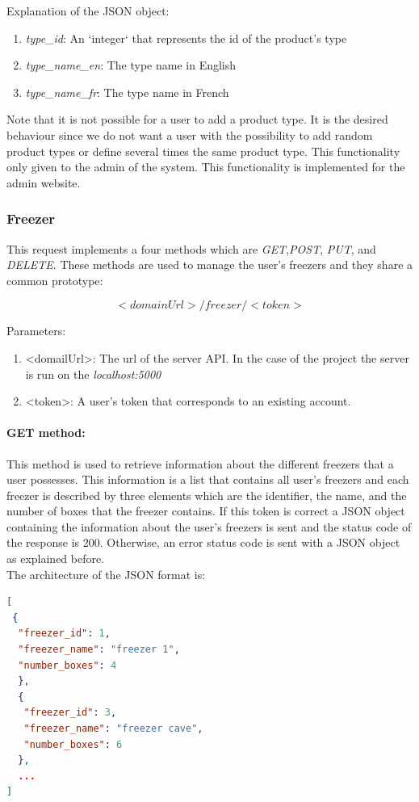Explanation of the  JSON object:
\begin{enumerate}
\item \textit{type\_id}: An `integer` that represents the id of the product's type
\item \textit{type\_name\_en}: The type name in English
\item \textit{type\_name\_fr}: The type name in French
\end{enumerate}

Note that it is not possible for a user to add a product type. It is the desired behaviour since we do not want a user with the possibility to add random product types or define several times the same product type. This functionality only given to the admin of the system. This functionality is implemented for the admin website.

\subsubsection{Freezer}
This request implements a four methods which are \textit{GET},\textit{POST}, \textit{PUT}, and \textit{DELETE}. These methods are used to manage the user's freezers and they share a common prototype:

$$<domainUrl>/freezer/<token>$$

Parameters:
\begin{enumerate}
\item <domailUrl>: The url of the server API. In the case of the project the server is run on the \textit{localhost:5000}
\item <token>: A user's token that corresponds to an existing account.
\end{enumerate}

\paragraph{GET method:} This method is used to retrieve information about the different freezers that a user possesses. This information is a list that contains all user's freezers and each freezer is described by three elements which are the identifier, the name, and the number of boxes that the freezer contains. If this token is correct a JSON object containing the information about the user's freezers is sent and the status code of the response is 200. Otherwise, an error status code is sent with a JSON object as explained before.\\

The architecture of the JSON format is:
\begin{lstlisting}[language=json]
[
 {
  "freezer_id": 1,
  "freezer_name": "freezer 1",
  "number_boxes": 4
  },
  {
   "freezer_id": 3,
   "freezer_name": "freezer cave",
   "number_boxes": 6
  },
  ...
]
\end{lstlisting}

